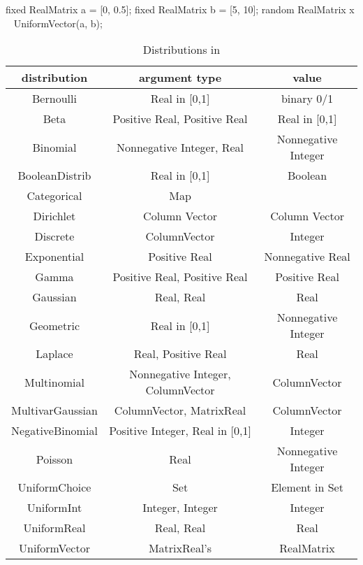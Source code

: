 \begin{blogcode}
fixed RealMatrix a = [0, 0.5];
fixed RealMatrix b = [5, 10];
random RealMatrix x ~ UniformVector(a, b);
\end{blogcode}


\begin{table}[H]
\centering
\caption{Distributions in \bl}
\begin{tabular}{ c c c }
\toprule 
distribution & argument type & value \\ 
 \midrule
Bernoulli & Real in [0,1] & binary 0/1 \\ 
Beta & Positive Real, Positive Real & Real in [0,1]  \\ 
Binomial & Nonnegative Integer, Real & Nonnegative Integer \\ 
BooleanDistrib & Real in [0,1] & Boolean \\ 
Categorical & Map &  \\
Dirichlet & Column Vector & Column Vector \\
Discrete & ColumnVector & Integer \\
Exponential & Positive Real & Nonnegative Real \\ 
Gamma & Positive Real, Positive Real & Positive Real \\ 
Gaussian & Real, Real & Real  \\ 
Geometric & Real in [0,1] & Nonnegative Integer \\ 
Laplace & Real, Positive Real & Real  \\ 
Multinomial & Nonnegative Integer, ColumnVector & ColumnVector \\
MultivarGaussian & ColumnVector, MatrixReal & ColumnVector  \\
NegativeBinomial & Positive Integer, Real in [0,1] & Integer  \\ 
Poisson & Real & Nonnegative Integer  \\ 
UniformChoice & Set & Element in Set \\
UniformInt & Integer, Integer & Integer  \\
UniformReal & Real, Real & Real  \\
UniformVector & MatrixReal's & RealMatrix \\
 \bottomrule
\end{tabular} 
\end{table}
